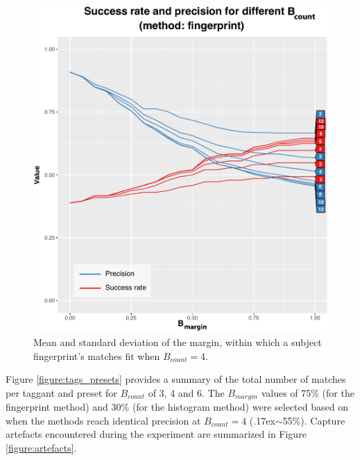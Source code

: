 \documentclass[thesis.tex]{subfiles}
\begin{document}
\begin{figure}
\centering \includegraphics[page=3,width=\textwidth,height=\textheight,keepaspectratio=true]{images/experiment/match_precision}
\caption{Mean and standard deviation of the margin, within which a subject fingerprint's matches fit when $B_{count}=4$.}
\label{figure:match_precision_margin}
\end{figure}

Figure \ref{figure:tags_presets} provides a summary of the total number of matches per taggant and preset for $B_{count}$ of 3, 4 and 6. The $B_{margin}$ values of 75\% (for the fingerprint method) and 30\% (for the histogram method) were selected based on when the methods reach identical precision at $B_{count}=4$ ({\raise.17ex\hbox{$\scriptstyle\sim$}}55\%). Capture artefacts encountered during the experiment are summarized in Figure \ref{figure:artefacts}.
\end{document}
